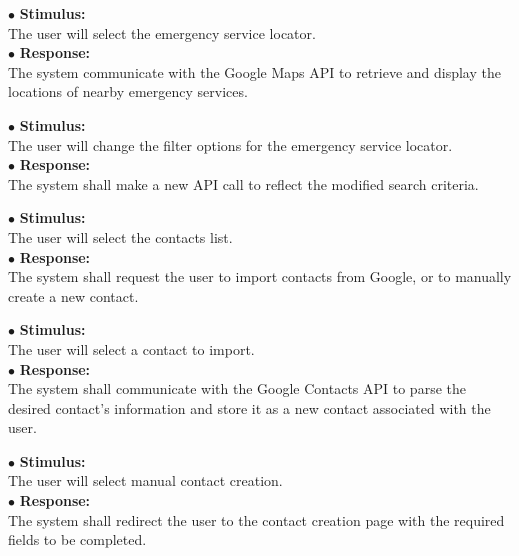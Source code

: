 \documentclass{scrreprt}
\begin{document}
\vspace{4mm}
	\hspace{-4.75mm} $\bullet$ \textbf{Stimulus:} \\ \hspace{5mm} The user will select the emergency service locator.\\
	$\bullet$ \textbf{Response:} \\ \hspace{5mm} The system communicate with the Google Maps API to retrieve and display the locations of nearby emergency services.

\vspace{4mm}
	\hspace{-4.75mm} $\bullet$ \textbf{Stimulus:} \\ \hspace{5mm} The user will change the filter options for the emergency service locator.\\
	$\bullet$ \textbf{Response:} \\ \hspace{5mm} The system shall make a new API call to reflect the modified search criteria.

\vspace{4mm}
	\hspace{-4.75mm} $\bullet$ \textbf{Stimulus:} \\ \hspace{5mm} The user will select the contacts list.\\
	$\bullet$ \textbf{Response:} \\ \hspace{5mm} The system shall request the user to import contacts from Google, or to manually create a new contact.
\newpage

\vspace{4mm}
	\hspace{-4.75mm} $\bullet$ \textbf{Stimulus:} \\ \hspace{5mm} The user will select a contact to import.\\
	$\bullet$ \textbf{Response:} \\ \hspace{5mm} The system shall communicate with the Google Contacts API to parse the desired contact's information and store it as a new contact associated with the user.

\vspace{4mm}
	\hspace{-4.75mm} $\bullet$ \textbf{Stimulus:} \\ \hspace{5mm} The user will select manual contact creation.\\
	$\bullet$ \textbf{Response:} \\ \hspace{5mm} The system shall redirect the user to the contact creation page with the required fields to be completed.
\end{document}
